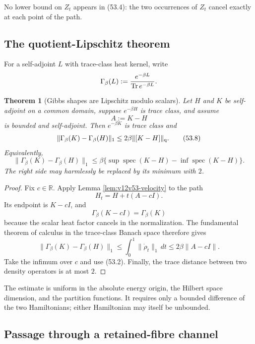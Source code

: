 \documentclass[11pt]{article}
\newtheorem{theorem}{Theorem}[section]
\theoremstyle{remark}
\begin{document}
No lower bound on \(Z_t\) appears in (53.4): the two occurrences of
\(Z_t\) cancel exactly at each point of the path.

\subsection{The quotient-Lipschitz theorem}

For a self-adjoint \(L\) with trace-class heat kernel, write
\[
 \Gamma_\beta(L)
 :=
 {e^{-\beta L}\over\operatorname{Tr}e^{-\beta L}}.
\]

\begin{theorem}[Gibbs shapes are Lipschitz modulo scalars]
\label{thm:v12v53-quotient-Lipschitz}
Let \(H\) and \(K\) be self-adjoint on a common domain, suppose
\(e^{-\beta H}\) is trace class, and assume
\[
                         A:=K-H
\]
is bounded and self-adjoint.  Then \(e^{-\beta K}\) is trace class
and
\begin{equation}
 \|\Gamma_\beta(K)-\Gamma_\beta(H)\|_1
 \leq
 2\beta\|[K-H]\|_{\rm q}.                         \tag{53.8}
\end{equation}
Equivalently,
\begin{equation}
 \|\Gamma_\beta(K)-\Gamma_\beta(H)\|_1
 \leq
 \beta\{\sup\operatorname{spec}(K-H)
       -\inf\operatorname{spec}(K-H)\}.           \tag{53.9}
\end{equation}
The right side may harmlessly be replaced by its minimum with \(2\).
\end{theorem}

\begin{proof}
Fix \(c\in\mathbb R\).  Apply Lemma
\ref{lem:v12v53-velocity} to the path
\[
 H_t=H+t(A-cI).
\]
Its endpoint is \(K-cI\), and
\[
 \Gamma_\beta(K-cI)=\Gamma_\beta(K)
\]
because the scalar heat factor cancels in the normalization.
The fundamental theorem of calculus in the trace-class Banach space
therefore gives
\[
 \|\Gamma_\beta(K)-\Gamma_\beta(H)\|_1
 \leq
 \int_0^1\|\dot\rho_t\|_1\,dt
 \leq2\beta\|A-cI\|.
\]
Take the infimum over \(c\) and use (53.2).  Finally, the trace
distance between two density operators is at most \(2\).
\end{proof}

The estimate is uniform in the absolute energy origin, the Hilbert
space dimension, and the partition functions.  It requires only a
bounded difference of the two Hamiltonians; either Hamiltonian may
itself be unbounded.

\subsection{Passage through a retained-fibre channel}
\end{document}
